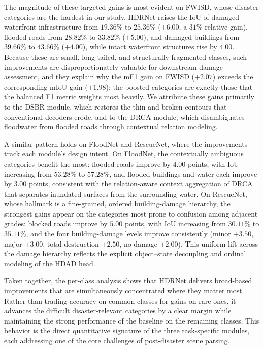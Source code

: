 \documentclass[lettersize,journal]{IEEEtran}
\begin{document}
The magnitude of these targeted gains is most evident on FWISD, whose disaster categories are the hardest in our study. HDRNet raises the IoU of damaged waterfront infrastructure from $19.36\%$ to $25.36\%$ ($+6.00$, a $31\%$ relative gain), flooded roads from $28.82\%$ to $33.82\%$ ($+5.00$), and damaged buildings from $39.66\%$ to $43.66\%$ ($+4.00$), while intact waterfront structures rise by $4.00$. Because these are small, long-tailed, and structurally fragmented classes, such improvements are disproportionately valuable for downstream damage assessment, and they explain why the mF1 gain on FWISD ($+2.07$) exceeds the corresponding mIoU gain ($+1.98$): the boosted categories are exactly those that the balanced F1 metric weights most heavily. We attribute these gains primarily to the DSBR module, which restores the thin and broken contours that conventional decoders erode, and to the DRCA module, which disambiguates floodwater from flooded roads through contextual relation modeling.

A similar pattern holds on FloodNet and RescueNet, where the improvements track each module's design intent. On FloodNet, the contextually ambiguous categories benefit the most: flooded roads improve by $4.00$ points, with IoU increasing from $53.28\%$ to $57.28\%$, and flooded buildings and water each improve by $3.00$ points, consistent with the relation-aware context aggregation of DRCA that separates inundated surfaces from the surrounding water. On RescueNet, whose hallmark is a fine-grained, ordered building-damage hierarchy, the strongest gains appear on the categories most prone to confusion among adjacent grades: blocked roads improve by $5.00$ points, with IoU increasing from $30.11\%$ to $35.11\%$, and the four building-damage levels improve consistently (minor $+3.50$, major $+3.00$, total destruction $+2.50$, no-damage $+2.00$). This uniform lift across the damage hierarchy reflects the explicit object--state decoupling and ordinal modeling of the HDAD head.

Taken together, the per-class analysis shows that HDRNet delivers broad-based improvements that are simultaneously concentrated where they matter most. Rather than trading accuracy on common classes for gains on rare ones, it advances the difficult disaster-relevant categories by a clear margin while maintaining the strong performance of the baseline on the remaining classes. This behavior is the direct quantitative signature of the three task-specific modules, each addressing one of the core challenges of post-disaster scene parsing.
\end{document}
